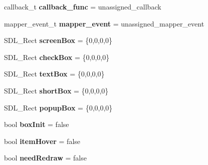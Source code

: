 \begin{DoxyCompactItemize}
\item 
\hypertarget{classDOSBoxMenu_1_1item_acbe948d23faaa4e00ba21c06bb112f50}{callback\-\_\-t {\bfseries callback\-\_\-func} = unassigned\-\_\-callback}\label{classDOSBoxMenu_1_1item_acbe948d23faaa4e00ba21c06bb112f50}

\item 
\hypertarget{classDOSBoxMenu_1_1item_a12d9b26e85b6f238d691f62f2de75af2}{mapper\-\_\-event\-\_\-t {\bfseries mapper\-\_\-event} = unassigned\-\_\-mapper\-\_\-event}\label{classDOSBoxMenu_1_1item_a12d9b26e85b6f238d691f62f2de75af2}

\item 
\hypertarget{classDOSBoxMenu_1_1item_aabfb3be655f5d9e5ba4e50714a460246}{S\-D\-L\-\_\-\-Rect {\bfseries screen\-Box} = \{0,0,0,0\}}\label{classDOSBoxMenu_1_1item_aabfb3be655f5d9e5ba4e50714a460246}

\item 
\hypertarget{classDOSBoxMenu_1_1item_ae363d39e11d0e9d29eca44bce7ef9cca}{S\-D\-L\-\_\-\-Rect {\bfseries check\-Box} = \{0,0,0,0\}}\label{classDOSBoxMenu_1_1item_ae363d39e11d0e9d29eca44bce7ef9cca}

\item 
\hypertarget{classDOSBoxMenu_1_1item_ae0cc11c7b5c300d27818dbc6d8ca9cc8}{S\-D\-L\-\_\-\-Rect {\bfseries text\-Box} = \{0,0,0,0\}}\label{classDOSBoxMenu_1_1item_ae0cc11c7b5c300d27818dbc6d8ca9cc8}

\item 
\hypertarget{classDOSBoxMenu_1_1item_a84ae8b2ea5c27f37e60d802046483d88}{S\-D\-L\-\_\-\-Rect {\bfseries short\-Box} = \{0,0,0,0\}}\label{classDOSBoxMenu_1_1item_a84ae8b2ea5c27f37e60d802046483d88}

\item 
\hypertarget{classDOSBoxMenu_1_1item_a0fe23ec47d985fd0cd4544ab79e872da}{S\-D\-L\-\_\-\-Rect {\bfseries popup\-Box} = \{0,0,0,0\}}\label{classDOSBoxMenu_1_1item_a0fe23ec47d985fd0cd4544ab79e872da}

\item 
\hypertarget{classDOSBoxMenu_1_1item_a002f9b9849fb96cd967c17b2676e26e2}{bool {\bfseries box\-Init} = false}\label{classDOSBoxMenu_1_1item_a002f9b9849fb96cd967c17b2676e26e2}

\item 
\hypertarget{classDOSBoxMenu_1_1item_ae9c0aab04c064252ac2aecd5080a5337}{bool {\bfseries item\-Hover} = false}\label{classDOSBoxMenu_1_1item_ae9c0aab04c064252ac2aecd5080a5337}

\item 
\hypertarget{classDOSBoxMenu_1_1item_ad8c40c0e6dedeea5350664fc2d6b97bf}{bool {\bfseries need\-Redraw} = false}\label{classDOSBoxMenu_1_1item_ad8c40c0e6dedeea5350664fc2d6b97bf}


\end{DoxyCompactItemize}
